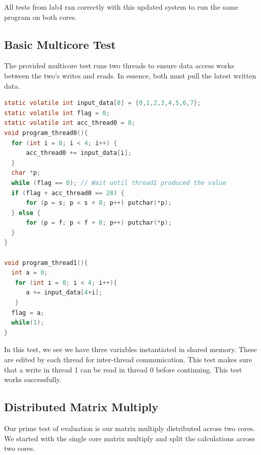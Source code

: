 \documentclass{article}
\begin{document}
All tests from lab4 ran correctly with this updated system to run the same program on both cores.

\subsection{Basic Multicore Test}

The provided multicore test runs two threads to ensure data access works between the two's writes and reads. In essence, both must pull the latest written data.

\begin{lstlisting}[language=C]
static volatile int input_data[8] = {0,1,2,3,4,5,6,7};
static volatile int flag = 0;
static volatile int acc_thread0 = 0;
void program_thread0(){
  for (int i = 0; i < 4; i++) {
      acc_thread0 += input_data[i];
  }
  char *p;
  while (flag == 0); // Wait until thread1 produced the value
  if (flag + acc_thread0 == 28) {
      for (p = s; p < s + 8; p++) putchar(*p);
  } else {
      for (p = f; p < f + 8; p++) putchar(*p);
  }
}

void program_thread1(){
  int a = 0;
   for (int i = 0; i < 4; i++){
      a += input_data[4+i];
   }
  flag = a;
  while(1);
}
\end{lstlisting}
In this test, we see we have three variables instantiated in shared memory. These are edited by each thread for inter-thread communication. This test makes sure that a write in thread 1 can be read in thread 0 before continuing. This test works successfully.

\subsection{Distributed Matrix Multiply}

Our prime test of evaluation is our matrix multiply distributed across two cores. We started with the single core matrix multiply and split the calculations across two cores. 
\end{document}
